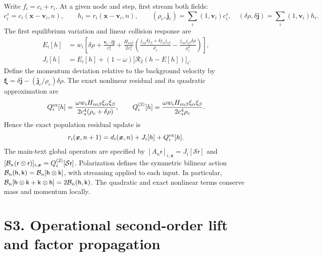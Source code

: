 \documentclass[10pt,letterpaper]{article}
\newcommand{\fld}[1]{\mathsf{#1}}
\begin{document}
Write $f_i=c_i+r_i$. At a given node and step, first stream both fields:
\begin{equation}
 c_i^s=c_i(\bm x-\bm v_i,n),\qquad h_i=r_i(\bm x-\bm v_i,n),\qquad
 (\rho_c,\bm j_c)=\sum_i(1,\bm v_i)c_i^s,\quad
 (\delta\rho,\delta\bm j)=\sum_i(1,\bm v_i)h_i.
\end{equation}
The first equilibrium variation and linear collision response are
\begin{align}
 E_i[h]&=w_i\left[\delta\rho+\frac{\bm v_i\cdot\delta\bm j}{c_s^2}
 +\frac{H_{i\alpha\beta}}{2c_s^4}
 \left(\frac{j_{c\alpha}\delta j_\beta+\delta j_\alpha j_{c\beta}}{\rho_c}
 -\frac{j_{c\alpha}j_{c\beta}\delta\rho}{\rho_c^2}\right)\right],\\
 J_i[h]&=E_i[h]+(1-\omega)\big[\mathcal R_2(h-E[h])\big]_i.
 \label{eq:Jpop}
\end{align}
Define the momentum deviation relative to the background velocity by $\bm\xi=\delta\bm j-(\bm j_c/\rho_c)\delta\rho$. The exact nonlinear residual and its quadratic approximation are
\begin{equation}
 Q_i^{\rm ex}[h]=\frac{\omega w_iH_{i\alpha\beta}\xi_\alpha\xi_\beta}
 {2c_s^4(\rho_c+\delta\rho)},\qquad
 Q_i^{(2)}[h]=\frac{\omega w_iH_{i\alpha\beta}\xi_\alpha\xi_\beta}
 {2c_s^4\rho_c}.
 \label{eq:Qpop}
\end{equation}
Hence the exact population residual update is
\begin{equation}
 r_i(\bm x,n+1)=d_i(\bm x,n)+J_i[h]+Q_i^{\rm ex}[h].
 \label{eq:exactresidual}
\end{equation}
The main-text global operators are specified by $[A_n\fld r]_{i,\bm x}=J_i[\mathcal S\fld r]$ and $[\B_n(\fld r\otimes\fld r)]_{i,\bm x}=Q_i^{(2)}[\mathcal S\fld r]$. Polarization defines the symmetric bilinear action $\mathcal B_n(\fld h,\fld k)=\B_n[\fld h\otimes\fld k]$, with streaming applied to each input. In particular, $\B_n[\fld h\otimes\fld k+\fld k\otimes\fld h]=2\mathcal B_n(\fld h,\fld k)$. The quadratic and exact nonlinear terms conserve mass and momentum locally.

\newpage
\section*{S3. Operational second-order lift and factor propagation}
\end{document}

